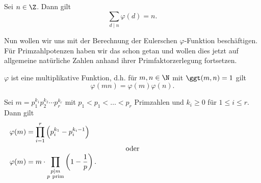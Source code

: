 \begin{thm}\autolabel
	Sei $n \in \Z$. Dann gilt
	\[ \sum_{d \mid n} \varphi(d) = n. \]
\end{thm}

Nun wollen wir uns mit der Berechnung der Eulerschen $\varphi$-Funktion beschäftigen. Für Primzahlpotenzen haben wir das schon getan und wollen dies jetzt auf allgemeine natürliche Zahlen anhand ihrer Primfaktorzerlegung fortsetzen.

\begin{thm}\autolabel\video
	$\varphi$ ist eine multiplikative Funktion, d.h. für $m,n \in \N$ mit $\ggt(m,n) = 1$ gilt $$\varphi(mn) = \varphi(m)\varphi(n).$$
\end{thm}

\begin{cor}
	Sei $m = p_1^{k_1} p_2^{k_2} \dotsm p_r^{k_r}$ mit $p_1 < p_1 < \dots < p_r$ Primzahlen und $k_i \geq 0$ für $1 \leq i \leq r$. Dann gilt
	\begin{align*}
		\varphi(m) &= \prod_{i=1}^r \left( p_i^{k_1} - p_i^{k_i-1} \right)\\
		\noalign{\centering oder}
		\varphi(m) &= m \cdot \prod_{\substack{p \mid  m \\ p \ \text{prim}}} \left( 1-\frac{1}{p} \right).
	\end{align*}
\end{cor}